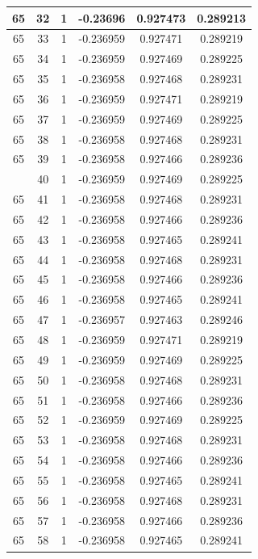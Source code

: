 \documentclass[12pt,a4paper]{article}
\numberwithin{equation}{section}
\numberwithin{figure}{section}
\numberwithin{table}{section}
\begin{document}
\begin{longtable}{|c|c|c|c|c|c|}
65 & 32 & 1 & -0.23696 & 0.927473 & 0.289213 \\ \hline
65 & 33 & 1 & -0.236959 & 0.927471 & 0.289219 \\ \hline
65 & 34 & 1 & -0.236959 & 0.927469 & 0.289225 \\ \hline
65 & 35 & 1 & -0.236958 & 0.927468 & 0.289231 \\ \hline
65 & 36 & 1 & -0.236959 & 0.927471 & 0.289219 \\ \hline
65 & 37 & 1 & -0.236959 & 0.927469 & 0.289225 \\ \hline
65 & 38 & 1 & -0.236958 & 0.927468 & 0.289231 \\ \hline
65 & 39 & 1 & -0.236958 & 0.927466 & 0.289236 \\ \hline
\pagebreak
65 & 40 & 1 & -0.236959 & 0.927469 & 0.289225 \\ \hline
65 & 41 & 1 & -0.236958 & 0.927468 & 0.289231 \\ \hline
65 & 42 & 1 & -0.236958 & 0.927466 & 0.289236 \\ \hline
65 & 43 & 1 & -0.236958 & 0.927465 & 0.289241 \\ \hline
65 & 44 & 1 & -0.236958 & 0.927468 & 0.289231 \\ \hline
65 & 45 & 1 & -0.236958 & 0.927466 & 0.289236 \\ \hline
65 & 46 & 1 & -0.236958 & 0.927465 & 0.289241 \\ \hline
65 & 47 & 1 & -0.236957 & 0.927463 & 0.289246 \\ \hline
65 & 48 & 1 & -0.236959 & 0.927471 & 0.289219 \\ \hline
65 & 49 & 1 & -0.236959 & 0.927469 & 0.289225 \\ \hline
65 & 50 & 1 & -0.236958 & 0.927468 & 0.289231 \\ \hline
65 & 51 & 1 & -0.236958 & 0.927466 & 0.289236 \\ \hline
65 & 52 & 1 & -0.236959 & 0.927469 & 0.289225 \\ \hline
65 & 53 & 1 & -0.236958 & 0.927468 & 0.289231 \\ \hline
65 & 54 & 1 & -0.236958 & 0.927466 & 0.289236 \\ \hline
65 & 55 & 1 & -0.236958 & 0.927465 & 0.289241 \\ \hline
65 & 56 & 1 & -0.236958 & 0.927468 & 0.289231 \\ \hline
65 & 57 & 1 & -0.236958 & 0.927466 & 0.289236 \\ \hline
65 & 58 & 1 & -0.236958 & 0.927465 & 0.289241 \\ \hline

\end{longtable}
\end{document}

